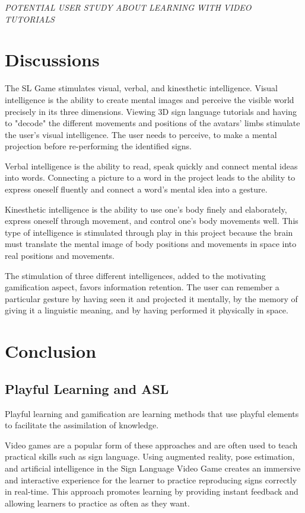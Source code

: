 \textit{POTENTIAL USER STUDY ABOUT LEARNING WITH VIDEO TUTORIALS}

\section{Discussions}

The SL Game stimulates visual, verbal, and kinesthetic intelligence. 
Visual intelligence is the ability to create mental images and perceive the visible world precisely in its three dimensions. Viewing 3D sign language tutorials and having to "decode" the different movements and positions of the avatars' limbs stimulate the user's visual intelligence. The user needs to perceive, to make a mental projection before re-performing the identified signs.

Verbal intelligence is the ability to read, speak quickly and connect mental ideas into words. Connecting a picture to a word in the project leads to the ability to express oneself fluently and connect a word's mental idea into a gesture. 

Kinesthetic intelligence is the ability to use one's body finely and elaborately, express oneself through movement, and control one's body movements well. This type of intelligence is stimulated through play in this project because the brain must translate the mental image of body positions and movements in space into real positions and movements. 

The stimulation of three different intelligences, added to the motivating gamification aspect, favors information retention. The user can remember a particular gesture by having seen it and projected it mentally, by the memory of giving it a linguistic meaning, and by having performed it physically in space.

\section{Conclusion}

\subsection{Playful Learning and ASL}

Playful learning and gamification are learning methods that use playful elements to facilitate the assimilation of knowledge. 

Video games are a popular form of these approaches and are often used to teach practical skills such as sign language. Using augmented reality, pose estimation, and artificial intelligence in the Sign Language Video Game creates an immersive and interactive experience for the learner to practice reproducing signs correctly in real-time. 
This approach promotes learning by providing instant feedback and allowing learners to practice as often as they want. 

